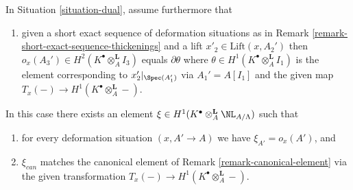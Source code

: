 \begin{lemma}
\label{lemma-dual-obstruction}
In Situation \ref{situation-dual}, assume furthermore that
\begin{enumerate}
\item[(iv)] given a short exact sequence of deformation situations
as in Remark \ref{remark-short-exact-sequence-thickenings} and
a lift $x'_2 \in \text{Lift}(x, A_2')$ then
$o_x(A_3') \in H^2(K^\bullet \otimes_A^\mathbf{L} I_3)$
equals $\partial\theta$ where
$\theta \in H^1(K^\bullet \otimes_A^\mathbf{L} I_1)$
is the element corresponding to $x'_2|_{\Spec(A_1')}$ via
$A_1' = A[I_1]$ and the given map
$T_x(-) \to H^1(K^\bullet \otimes_A^\mathbf{L} -)$.
\end{enumerate}
In this case there exists an element
$\xi \in H^1(K^\bullet \otimes_A^\mathbf{L} \NL_{A/\Lambda})$
such that
\begin{enumerate}
\item for every deformation situation $(x, A' \to A)$ we have
$\xi_{A'} = o_x(A')$, and
\item $\xi_{can}$ matches the canonical element of
Remark \ref{remark-canonical-element} via the given transformation
$T_x(-) \to H^1(K^\bullet \otimes_A^\mathbf{L} -)$.
\end{enumerate}
\end{lemma}

